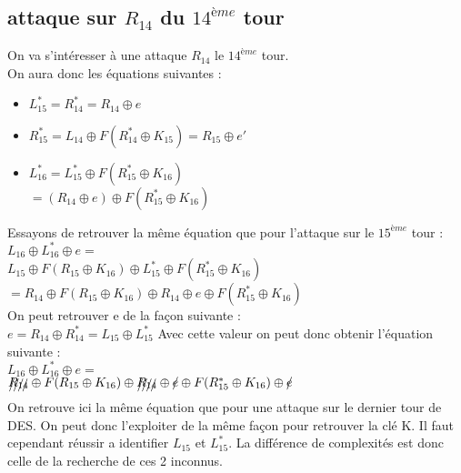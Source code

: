 \documentclass[a4paper,11pt]{article}
\begin{document}
	\subsection{attaque sur $R_{14}$ du $14^{ème}$ tour}
	On va s'intéresser à une attaque $R_{14}$ le $14^{ème}$ tour.\\
	On aura donc les équations suivantes :
	\begin{itemize}
		\item $L_{15}^{*} = R_{14}^{*} = R_{14} \oplus e$
		\item $R_{15}^{*} = L_{14}\oplus F( R_{14}^{*}\oplus K_{15}) = R_{15} \oplus e'$
		\item $L_{16}^{*} = L_{15}^{*}\oplus F( R_{15}^{*}\oplus K_{16})$\\
		$= (R_{14} \oplus e)\oplus  F( R_{15}^{*}\oplus K_{16})$
	\end{itemize}
	Essayons de retrouver la même équation que pour l'attaque sur le $15^{ème}$ tour :\\
	$L_{16} \oplus L_{16}^{*} \oplus e = $\\ 
	$L_{15}\oplus  F( R_{15}\oplus K_{16})\oplus L_{15}^{*} \oplus F( R_{15}^{*}\oplus K_{16})$\\
	$= R_{14}\oplus  F( R_{15}\oplus K_{16})\oplus  R_{14} \oplus e \oplus F( R_{15}^{*}\oplus K_{16})$\\
	On peut retrouver e de la façon suivante :\\
	$e = R_{14}\oplus R_{14}^{*} = L_{15}\oplus  L_{15}^{*}$
	Avec cette valeur on peut donc obtenir l'équation suivante :\\
	$L_{16} \oplus L_{16}^{*} \oplus e = $\\ 
	$\xout{R_{14}}\oplus  F( R_{15}\oplus K_{16})\oplus  \xout{R_{14}} \oplus \xout{e} \oplus F( R_{15}^{*}\oplus K_{16})\oplus \xout{e}$\\
	On retrouve ici la même équation que pour une attaque sur le dernier tour de DES. On peut donc l'exploiter de la même façon pour retrouver la clé K. Il faut cependant réussir a identifier $L_{15}$ et $L_{15}^{*}$. La différence de complexités est donc celle de la recherche de ces 2 inconnus.\\
\end{document}
